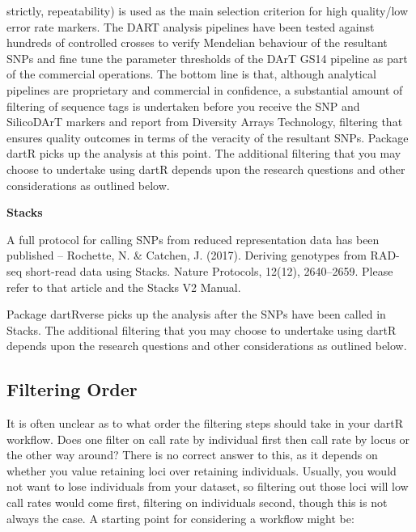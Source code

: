 \documentclass[
  letterpaper,
  DIV=11,
  numbers=noendperiod]{scrreprt}
\begin{document}
strictly, repeatability) is used as the main selection criterion for
high quality/low error rate markers. The DART analysis pipelines have
been tested against hundreds of controlled crosses to verify Mendelian
behaviour of the resultant SNPs and fine tune the parameter thresholds
of the DArT GS14 pipeline as part of the commercial operations. The
bottom line is that, although analytical pipelines are proprietary and
commercial in confidence, a substantial amount of filtering of sequence
tags is undertaken before you receive the SNP and SilicoDArT markers and
report from Diversity Arrays Technology, filtering that ensures quality
outcomes in terms of the veracity of the resultant SNPs. Package dartR
picks up the analysis at this point. The additional filtering that you
may choose to undertake using dartR depends upon the research questions
and other considerations as outlined below.

\textbf{Stacks}

A full protocol for calling SNPs from reduced representation data has
been published -- Rochette, N. \& Catchen, J. (2017). Deriving genotypes
from RAD-seq short-read data using Stacks. Nature Protocols, 12(12),
2640--2659. Please refer to that article and the Stacks V2 Manual.

Package dartRverse picks up the analysis after the SNPs have been called
in Stacks. The additional filtering that you may choose to undertake
using dartR depends upon the research questions and other considerations
as outlined below.

\hypertarget{filtering-order}{%
\subsection{Filtering Order}\label{filtering-order}}

It is often unclear as to what order the filtering steps should take in
your dartR workflow. Does one filter on call rate by individual first
then call rate by locus or the other way around? There is no correct
answer to this, as it depends on whether you value retaining loci over
retaining individuals. Usually, you would not want to lose individuals
from your dataset, so filtering out those loci will low call rates would
come first, filtering on individuals second, though this is not always
the case. A starting point for considering a workflow might be:
\end{document}
